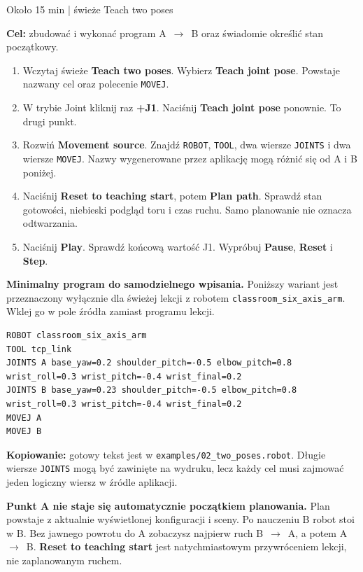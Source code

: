 \documentclass[10pt,a4paper]{article}
\newcommand{\ui}[1]{\textbf{\textsf{#1}}}
\newcommand{\cmd}[1]{\texttt{#1}}
\newcommand{\page}[2]{\clearpage{\Large\bfseries\color{navy}#1}\par{\small\color{accent}#2}\par\vspace{3pt}}
\begin{document}
\page{2. Naucz dwa punkty i uruchom swój program}{Około 15 min | świeże Teach two poses}
\begin{goal}\textbf{Cel:} zbudować i wykonać program A~\(\rightarrow\)~B oraz świadomie określić stan początkowy.\end{goal}
\begin{enumerate}
\item Wczytaj świeże \ui{Teach two poses}. Wybierz \ui{Teach joint pose}. Powstaje nazwany cel oraz polecenie \cmd{MOVEJ}.
\item W trybie Joint kliknij raz \ui{+J1}. Naciśnij \ui{Teach joint pose} ponownie. To drugi punkt.
\item Rozwiń \ui{Movement source}. Znajdź \cmd{ROBOT}, \cmd{TOOL}, dwa wiersze \cmd{JOINTS} i dwa wiersze \cmd{MOVEJ}. Nazwy wygenerowane przez aplikację mogą różnić się od A i B poniżej.
\item Naciśnij \ui{Reset to teaching start}, potem \ui{Plan path}. Sprawdź stan gotowości, niebieski podgląd toru i czas ruchu. Samo planowanie nie oznacza odtwarzania.
\item Naciśnij \ui{Play}. Sprawdź końcową wartość J1. Wypróbuj \ui{Pause}, \ui{Reset} i \ui{Step}.
\end{enumerate}
\textbf{Minimalny program do samodzielnego wpisania.} Poniższy wariant jest przeznaczony wyłącznie dla świeżej lekcji z robotem \cmd{classroom\_six\_axis\_arm}. Wklej go w pole źródła zamiast programu lekcji.
\begin{lstlisting}
ROBOT classroom_six_axis_arm
TOOL tcp_link
JOINTS A base_yaw=0.2 shoulder_pitch=-0.5 elbow_pitch=0.8 wrist_roll=0.3 wrist_pitch=-0.4 wrist_final=0.2
JOINTS B base_yaw=0.23 shoulder_pitch=-0.5 elbow_pitch=0.8 wrist_roll=0.3 wrist_pitch=-0.4 wrist_final=0.2
MOVEJ A
MOVEJ B
\end{lstlisting}
\textbf{Kopiowanie:} gotowy tekst jest w \cmd{examples/02\_two\_poses.robot}. Długie wiersze \cmd{JOINTS} mogą być zawinięte na wydruku, lecz każdy cel musi zajmować jeden logiczny wiersz w źródle aplikacji.
\begin{remember}\textbf{Punkt A nie staje się automatycznie początkiem planowania.} Plan powstaje z aktualnie wyświetlonej konfiguracji i sceny. Po nauczeniu B robot stoi w B. Bez jawnego powrotu do A zobaczysz najpierw ruch B~\(\rightarrow\)~A, a potem A~\(\rightarrow\)~B. \ui{Reset to teaching start} jest natychmiastowym przywróceniem lekcji, nie zaplanowanym ruchem.\end{remember}
\begin{center}\end{center}
\end{document}
